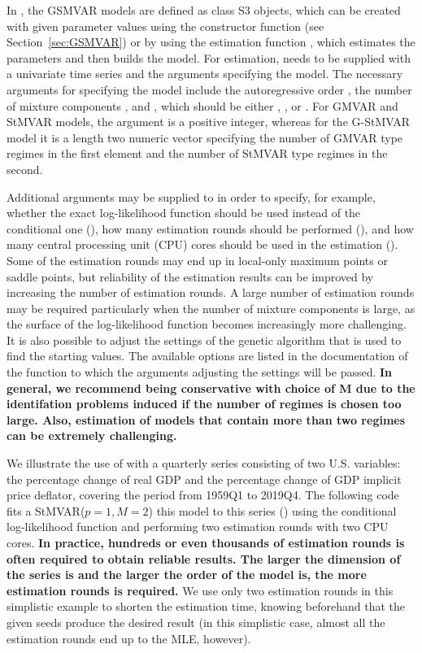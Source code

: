 \documentclass[nojss]{jss} %
\begin{document}
In , the GSMVAR models are defined as class  S3 objects, which can be created with given parameter values using the constructor function  (see Section~\ref{sec:GSMVAR}) or by using the estimation function , which estimates the parameters and then builds the model. For estimation,  needs to be supplied with a univariate time series and the arguments specifying the model. The necessary arguments for specifying the model include the autoregressive order , the number of mixture components , and , which should be either , , or . For GMVAR and StMVAR models, the argument  is a positive integer, whereas for the G-StMVAR model it is a length two numeric vector specifying the number of GMVAR type regimes in the first element and the number of StMVAR type regimes in the second.

Additional arguments may be supplied to  in order to specify, for example, whether the exact log-likelihood function should be used instead of the conditional one (), how many estimation rounds should be performed (), and how many central processing unit (CPU) cores should be used in the estimation (). Some of the estimation rounds may end up in local-only maximum points or saddle points, but reliability of the estimation results can be improved by increasing the number of estimation rounds. A large number of estimation rounds may be required particularly when the number of mixture components is large, as the surface of the log-likelihood function becomes increasingly more challenging. It is also possible to adjust the settings of the genetic algorithm that is used to find the starting values. The available options are listed in the documentation of the function  to which the arguments adjusting the settings will be passed. \textbf{In general, we recommend being conservative with choice of M due to the identifation problems induced if the number of regimes is chosen too large. Also, estimation of models that contain more than two regimes can be extremely challenging.}

We illustrate the use of  with a quarterly series consisting of two U.S. variables: the percentage change of real GDP and the percentage change of GDP implicit price deflator, covering the period from 1959Q1 to 2019Q4. The following code fits a StMVAR($p=1,M=2$) this model to this series () using the conditional log-likelihood function and performing two estimation rounds with two CPU cores. \textbf{In practice, hundreds or even thousands of estimation rounds is often required to obtain reliable results. The larger the dimension of the series is and the larger the order of the model is, the more estimation rounds is required.} We use only two estimation rounds in this simplistic example to shorten the estimation time, knowing beforehand that the given seeds produce the desired result (in this simplistic case, almost all the estimation rounds end up to the MLE, however).
\end{document}
